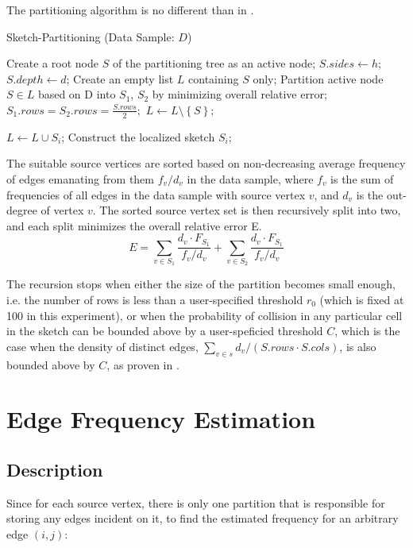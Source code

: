 The partitioning algorithm is no different than in \cite{DBLP}. 

\begin{algorithm}
\caption{Sketch-Partitioning (Data Sample: $D$)}\label{euclid}
\begin{algorithmic}[1]

\State Create a root node $S$ of the partitioning tree as an
active node;
\State $S.sides \gets h$;
\State $S.depth \gets d$;
\State Create an empty list $L$ containing $S$ only;
\State Partition active node $S \in L$ based on D into $S_1$, $S_2$ by minimizing overall relative error;
\State $S_1.rows = S_2.rows = \frac{S.rows}{2};$
\State $L \gets L \setminus \left \{ S \right \};$
    
    \State $L \gets L \cup S_i$;
    \Else
    \State Construct the localized sketch $S_i$;
    
    \EndIf
\EndFor
\EndWhile

\end{algorithmic}
\end{algorithm}

The suitable source vertices are sorted based on non-decreasing average frequency of edges emanating from them $f_v/d_v$ in the data sample, where $f_v$ is the sum of frequencies of all edges in the data sample with source vertex $v$, and $d_v$ is the out-degree of vertex $v$. The sorted source vertex set is then recursively split into two, and each split minimizes the overall relative error E. \[E = \sum_{v \in S_1} \frac{d_v \cdot F_{S_1}}{f_v / d_v} + \sum_{v \in S_2} \frac{d_v \cdot F_{S_1}}{f_v / d_v}\]

The recursion stops when either the size of the partition becomes small enough, i.e. the number of rows is less than a user-specified threshold $r_0$ (which is fixed at 100 in this experiment), or when the probability of collision in any particular cell in the sketch can be bounded above by a user-speficied threshold $C$, which is the case when the density of distinct edges, $\sum_{v \in s} d_v/(S.rows \cdot S.cols)$, is also bounded above by $C$, as proven in \cite{DBLP}.


\section{Edge Frequency Estimation}

\subsection{Description}
Since for each source vertex, there is only one partition that is responsible for storing any edges incident on it, to find the estimated frequency for an arbitrary edge $(i,j)$:

